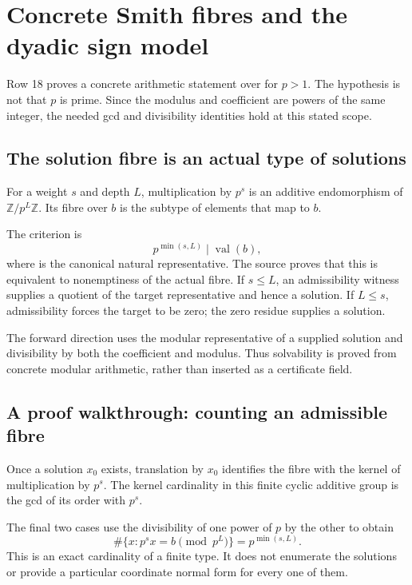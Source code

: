 \section{Concrete Smith fibres and the dyadic sign model}\label{sec:smith}

Row 18 proves a concrete arithmetic statement over  for $p>1$. The hypothesis is not that $p$ is prime. Since the modulus and coefficient are powers of the same integer, the needed gcd and divisibility identities hold at this stated scope.

\subsection{The solution fibre is an actual type of solutions}

For a weight $s$ and depth $L$, multiplication by $p^s$ is an additive endomorphism of $\mathbb Z/p^L\mathbb Z$. Its fibre over $b$ is the subtype of elements that map to $b$.

The criterion is
\[
p^{\min(s,L)}\mid\operatorname{val}(b),
\]
where  is the canonical natural representative. The source proves that this is equivalent to nonemptiness of the actual fibre. If $s\le L$, an admissibility witness supplies a quotient of the target representative and hence a solution. If $L\le s$, admissibility forces the target to be zero; the zero residue supplies a solution.

The forward direction uses the modular representative of a supplied solution and divisibility by both the coefficient and modulus. Thus solvability is proved from concrete modular arithmetic, rather than inserted as a certificate field.

\subsection{A proof walkthrough: counting an admissible fibre}

Once a solution $x_0$ exists, translation by $x_0$ identifies the fibre with the kernel of multiplication by $p^s$. The kernel cardinality in this finite cyclic additive group is the gcd of its order with $p^s$.

The final two cases use the divisibility of one power of $p$ by the other to obtain
\[
\#\{x:p^sx=b\pmod {p^L}\}=p^{\min(s,L)}.
\]
This is an exact cardinality of a finite type. It does not enumerate the solutions or provide a particular coordinate normal form for every one of them.

